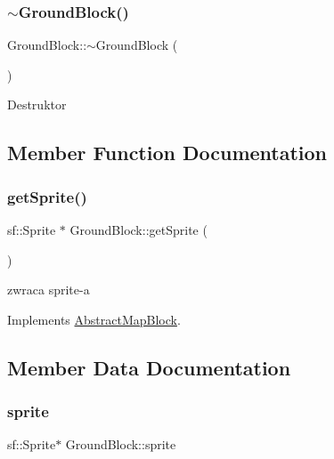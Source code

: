 \subsubsection{\texorpdfstring{$\sim$\+Ground\+Block()}{~GroundBlock()}}
{\footnotesize\ttfamily Ground\+Block\+::$\sim$\+Ground\+Block (\begin{DoxyParamCaption}{ }\end{DoxyParamCaption})}

Destruktor 

\subsection{Member Function Documentation}
\mbox{\label{class_ground_block_a73c0f8ff59ef53b18f03bc3f22f8f810}} 
\subsubsection{\texorpdfstring{get\+Sprite()}{getSprite()}}
{\footnotesize\ttfamily sf\+::\+Sprite $\ast$ Ground\+Block\+::get\+Sprite (\begin{DoxyParamCaption}{ }\end{DoxyParamCaption})\hspace{0.3cm}{\ttfamily [virtual]}}

zwraca sprite-\/a 

Implements \hyperlink{class_abstract_map_block_ab5a448a1b6478d10a8814c6d19c4fdb4}{Abstract\+Map\+Block}.



\subsection{Member Data Documentation}
\mbox{\label{class_ground_block_a235135fde9ffb53700b4bee134175dda}} 
\subsubsection{\texorpdfstring{sprite}{sprite}}
{\footnotesize\ttfamily sf\+::\+Sprite$\ast$ Ground\+Block\+::sprite\hspace{0.3cm}{\ttfamily [protected]}}

